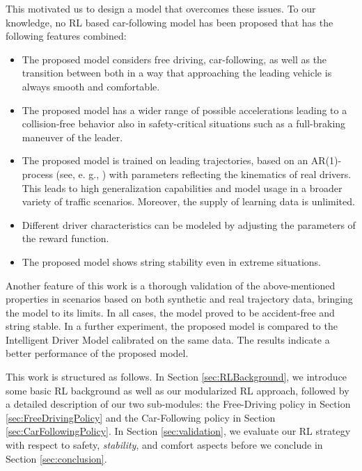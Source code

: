 \documentclass[review]{elsarticle}
\providecommand{\martin}[1]{#1}                  %
\providecommand{\martinc}[1]{}                  %
\providecommand{\3}{{\ss}}
\begin{document}
This motivated us to design a model \martin{that} overcomes these issues.
To our knowledge, no RL based car-following model has been proposed \martin{that} has the following features combined:


\begin{itemize}
	\item  The proposed model considers free driving,
          car-following, as well as the transition between both in a
          way that approaching the leading vehicle is \martin{always} smooth and comfortable.
	\item The proposed model has a wider range of possible
          accelerations \martin{leading} to a collision-free behavior
          also in safety-critical situations such as a full-braking maneuver of the leader.
	\item The proposed model is trained on leading trajectories,
          based on an AR(1)-process (see, e. g., \cite{HonerkampEngl})
          with parameters reflecting the kinematics of real
          drivers. This leads to high generalization capabilities and
          model usage in a broader variety of traffic
          scenarios. \martin{Moreover, the supply of learning data is
            unlimited.} 
	\item Different driver characteristics can be modeled by adjusting the parameters of the reward function.
	\item The proposed model shows string stability \martin{even in
          extreme situations}.
	
\end{itemize}

Another feature of this work is a thorough validation of the above-mentioned properties in scenarios based on both synthetic and real trajectory data, bringing the model to its limits. 
In all cases, the model proved to be accident-free and string stable.
In a further experiment, the proposed model is compared to the Intelligent Driver Model calibrated on the same data. The results indicate a better performance of the proposed model.

\martinc{Nach vorgestelltem Nebensatz oder Phrase (In Section ...,) folgt vor dem
  Hauptsatz (``we introduce...'') immer ein Komma}
This work is structured as follows. In Section \ref{sec:RLBackground},
we introduce some basic RL background as well as our modularized RL
approach, followed by a detailed description of our two sub-modules:
the Free-Driving policy in Section \ref{sec:FreeDrivingPolicy} and the
Car-Following policy in Section
\ref{sec:CarFollowingPolicy}. \martinc{In Englisch wird nach
  Doppelpunkt klein weitergeschrieben, wenn kein vollst\"andiger Satz
  folgt wie hier} In Section \ref{sec:validation}, we evaluate our RL
strategy with respect to safety, \emph{stability}, and comfort aspects
before we conclude in Section \ref{sec:conclusion}.
\end{document}
